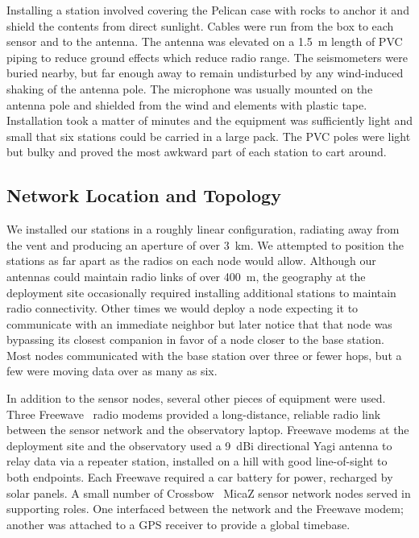 Installing a station involved covering the Pelican case with rocks to anchor
it and shield the contents from direct sunlight.  Cables were run from the
box to each sensor and to the antenna.  The antenna was elevated on a 1.5~m
length of PVC piping to reduce ground effects which reduce radio range.  The
seismometers were buried nearby, but far enough away to remain undisturbed by
any wind-induced shaking of the antenna pole.  The microphone was usually
mounted on the antenna pole and shielded from the wind and elements with
plastic tape.  Installation took a matter of minutes and the equipment was
sufficiently light and small that six stations could be carried in a large
pack.  The PVC poles were light but bulky and proved the most awkward part of
each station to cart around.

\subsection{Network Location and Topology}

We installed our stations in a roughly linear configuration, radiating away
from the vent and producing an aperture of over 3~km.  We attempted to
position the stations as far apart as the radios on each node would allow.
Although our antennas could maintain radio links of over 400~m, the geography
at the deployment site occasionally required installing additional stations
to maintain radio connectivity.  Other times we would deploy a node expecting
it to communicate with an immediate neighbor but later notice that that node
was bypassing its closest companion in favor of a node closer to the base
station.  Most nodes communicated with the base station over three or fewer
hops, but a few were moving data over as many as six.

In addition to the sensor nodes, several other pieces of equipment
were used.  Three Freewave~\cite{freewave} radio modems provided a
long-distance, reliable radio link between the sensor network and the
observatory laptop.  Freewave modems at the deployment site and the
observatory used a 9~dBi directional Yagi antenna to relay data via a
repeater station, installed on a hill with good line-of-sight to both
endpoints.  Each Freewave required a car battery for power, recharged
by solar panels.  A small number of Crossbow~\cite{xbow} MicaZ sensor
network nodes served in supporting roles.  One interfaced between the
network and the Freewave modem; another was attached to a GPS receiver
to provide a global timebase.

